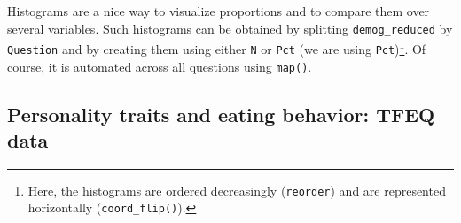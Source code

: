 \documentclass[
]{book}
\newenvironment{Shaded}{\begin{snugshade}}{\end{snugshade}}
\newcommand{\AttributeTok}[1]{\textcolor[rgb]{0.77,0.63,0.00}{#1}}
\newcommand{\ControlFlowTok}[1]{\textcolor[rgb]{0.13,0.29,0.53}{\textbf{#1}}}
\newcommand{\DecValTok}[1]{\textcolor[rgb]{0.00,0.00,0.81}{#1}}
\newcommand{\FunctionTok}[1]{\textcolor[rgb]{0.00,0.00,0.00}{#1}}
\newcommand{\NormalTok}[1]{#1}
\newcommand{\OtherTok}[1]{\textcolor[rgb]{0.56,0.35,0.01}{#1}}
\newcommand{\SpecialCharTok}[1]{\textcolor[rgb]{0.00,0.00,0.00}{#1}}
\newcommand{\StringTok}[1]{\textcolor[rgb]{0.31,0.60,0.02}{#1}}
\begin{document}
Histograms are a nice way to visualize proportions and to compare them over several variables. Such histograms can be obtained by splitting \texttt{demog\_reduced} by \texttt{Question} and by creating them using either \texttt{N} or \texttt{Pct} (we are using \texttt{Pct})\footnote{Here, the histograms are ordered decreasingly (\texttt{reorder}) and are represented horizontally (\texttt{coord\_flip()}).}. Of course, it is automated across all questions using \texttt{map()}.

\begin{Shaded}
\end{Shaded}

\hypertarget{personality-traits-and-eating-behavior-tfeq-data}{%
\subsection{Personality traits and eating behavior: TFEQ data}\label{personality-traits-and-eating-behavior-tfeq-data}}
\end{document}
